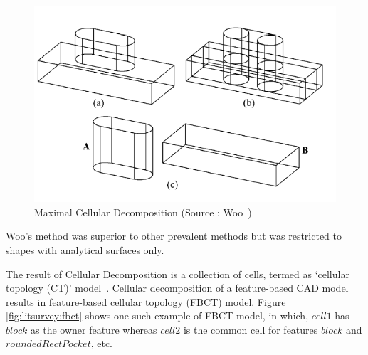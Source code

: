 \begin{figure}[!h]
\centering     %
\includegraphics[width=0.7\linewidth,valign=t]{images/WooMax}
\caption{Maximal Cellular Decomposition (Source : Woo~\cite{Woo2003})}
\label{fig:litsurvey:maxcd}
\end{figure}


Woo's method was superior to other prevalent methods but was restricted to shapes with analytical surfaces only.
 


 
 
 
The result of Cellular Decomposition is a collection of cells, termed as `cellular topology (CT)' model~\cite{Chen2006}. 
Cellular decomposition of a feature-based CAD model results in feature-based cellular topology (FBCT) model. Figure \ref{fig:litsurvey:fbct} shows one such example of FBCT model, in which, $cell 1$ has $block$ as the owner feature whereas $cell 2$ is the common cell for features $block$ and $roundedRectPocket$, etc. %


